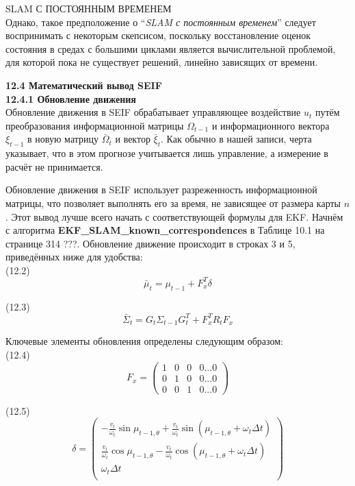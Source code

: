 \documentclass[10pt,a4paper]{article}
\begin{document}
SLAM С ПОСТОЯННЫМ ВРЕМЕНЕМ\\

Однако, такое предположение о “\textit{SLAM с постоянным временем}” следует воспринимать с некоторым скепсисом, поскольку восстановление оценок состояния в средах с большими циклами является вычислительной проблемой, для которой пока не существует решений, линейно зависящих от времени.

\textbf{12.4	Математический вывод SEIF}\\

\textbf{12.4.1	Обновление движения}\\

Обновление движения в SEIF обрабатывает управляющее воздействие $u_t$ путём преобразования информационной матрицы $\varOmega_{t-1}$ и информационного вектора $\xi_{t-1}$ в новую матрицу $\bar{\varOmega}_t$ и вектор $\bar{\xi}_t$.  Как обычно в нашей записи, черта указывает, что в этом прогнозе учитывается лишь управление, а измерение в расчёт не принимается.

Обновление движения в SEIF использует разреженность информационной матрицы, что позволяет выполнять его за время, не зависящее от размера карты $n$. Этот вывод лучше всего начать с соответствующей формулы для EKF. Начнём с алгоритма \textbf{EKF\_SLAM\_known\_correspondences} в Таблице 10.1 на странице 314 ???. Обновление движение происходит в строках 3 и 5, приведённых ниже для удобства:\\

(12.2)
$$\bar{\mu}_t=\mu_{t-1}+F_x^T\delta$$

(12.3)
$$\bar{\varSigma}_t=G_t\varSigma_{t-1}G_t^T+F_x^TR_tF_x$$

Ключевые элементы обновления определены следующим образом:\\

(12.4)
$$F_x=\left(\begin{array}{cccc}
1&0&0&0...0\\
0&1&0&0...0\\
0&0&1&0...0\end{array} \right)$$

(12.5)
$$\delta=\left(\begin{array}{c}
-\frac{v_t}{\omega_t}\sin\mu_{t-1,\theta}+\frac{v_t}{\omega_t}\sin(\mu_{t-1,\theta}+\omega_t\varDelta t)\\
\frac{v_t}{\omega_t}\cos\mu_{t-1,\theta}-\frac{v_t}{\omega_t}\cos(\mu_{t-1,\theta}+\omega_t\varDelta t)\\
\omega_t\varDelta t\\
\end{array} \right)$$
\end{document}
